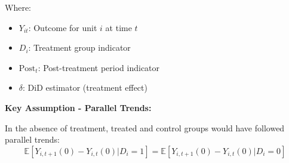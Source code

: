 Where:
\begin{itemize}
    \item $Y_{it}$: Outcome for unit $i$ at time $t$
    \item $D_i$: Treatment group indicator
    \item $\text{Post}_t$: Post-treatment period indicator
    \item $\delta$: DiD estimator (treatment effect)
\end{itemize}

\textbf{Key Assumption - Parallel Trends:}

In the absence of treatment, treated and control groups would have followed parallel trends:
\begin{equation}
\mathbb{E}[Y_{i,t+1}(0) - Y_{i,t}(0) | D_i = 1] = \mathbb{E}[Y_{i,t+1}(0) - Y_{i,t}(0) | D_i = 0]
\end{equation}

